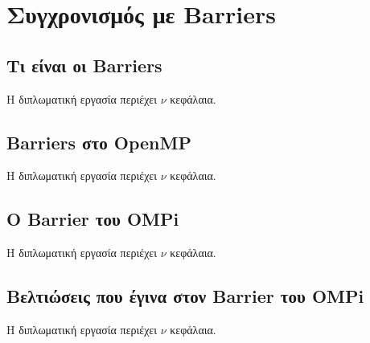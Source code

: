\chapter{Συγχρονισμός με Barriers}
\label{ch:Synchronization with Barriers}


\section{Τι είναι οι Barriers}
\label{sec:What Barriers are}
Η διπλωματική εργασία περιέχει $\nu$ κεφάλαια.

\section{Barriers στο OpenMP}
\label{sec:Barriers in OpenMP}
Η διπλωματική εργασία περιέχει $\nu$ κεφάλαια.

\section{Ο Barrier του OMPi}
\label{sec:OMPi's barrier}
Η διπλωματική εργασία περιέχει $\nu$ κεφάλαια.

\section{Βελτιώσεις που έγινα στον Barrier του OMPi}
\label{sec:Improvements in OMPi's barrier}
Η διπλωματική εργασία περιέχει $\nu$ κεφάλαια.
